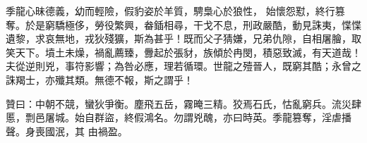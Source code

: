 \begin{pinyinscope}
 季龍心昧德義，幼而輕險，假豹姿於羊質，騁梟心於狼性，
 始懷怨懟，終行篡奪。於是窮驕極侈，勞役繁興，畚鍤相尋，干戈不息，刑政嚴酷，動見誅夷，惵惵遺黎，求哀無地，戎狄殘獷，斯為甚乎！既而父子猜嫌，兄弟仇隙，自相屠膾，取笑天下。墳土未燥，禍亂薦臻，釁起於張豺，族傾於冉閔，積惡致滅，有天道哉！夫從逆則兇，事符影響；為咎必應，理若循環。世龍之殪晉人，既窮其酷；永曾之誅羯士，亦殲其類。無德不報，斯之謂乎！



 贊曰：中朝不競，蠻狄爭衡。塵飛五岳，霧晻三精。狡焉石氏，怙亂窮兵。流災肆慝，剽邑屠城。始自群盜，終假鴻名。勿謂兇醜，亦曰時英。季龍篡奪，淫虐播聲。身喪國泯，其
 由禍盈。



\end{pinyinscope}